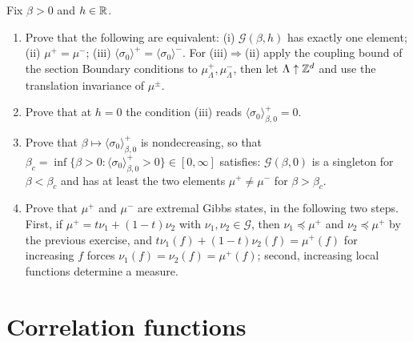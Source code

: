 \begin{exercise}
Fix $\beta>0$ and $h\in\mathbb R$.
\begin{enumerate}[label=(\alph*)]
\item Prove that the following are equivalent: (i) $\mathcal G(\beta,h)$ has
exactly one element; (ii) $\mu^+=\mu^-$; (iii)
$\langle\sigma_0\rangle^+=\langle\sigma_0\rangle^-$.  For (iii)$\Rightarrow$(ii)
apply the coupling bound of the section Boundary conditions to
$\mu^+_\Lambda,\mu^-_\Lambda$, then let $\Lambda\uparrow\mathbb Z^d$ and use the
translation invariance of $\mu^\pm$.
\item Prove that at $h=0$ the condition (iii) reads $\langle\sigma_0\rangle^+_{\beta,0}=0$.
\item Prove that $\beta\mapsto\langle\sigma_0\rangle^+_{\beta,0}$ is
nondecreasing, so that
$\beta_c=\inf\{\beta>0:\langle\sigma_0\rangle^+_{\beta,0}>0\}\in[0,\infty]$
satisfies: $\mathcal G(\beta,0)$ is a singleton for $\beta<\beta_c$ and has
at least the two elements $\mu^+\ne\mu^-$ for $\beta>\beta_c$.
\item Prove that $\mu^+$ and $\mu^-$ are extremal Gibbs states, in the
following two steps.  First, if $\mu^+=t\nu_1+(1-t)\nu_2$ with
$\nu_1,\nu_2\in\mathcal G$, then $\nu_1\preceq\mu^+$ and $\nu_2\preceq\mu^+$ by
the previous exercise, and $t\nu_1(f)+(1-t)\nu_2(f)=\mu^+(f)$ for increasing
$f$ forces $\nu_1(f)=\nu_2(f)=\mu^+(f)$; second, increasing local functions
determine a measure.
\end{enumerate}
\end{exercise}

\section{Correlation functions}


